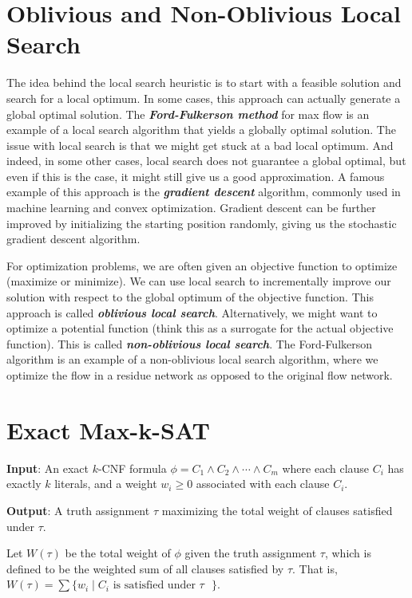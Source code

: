 \section{Oblivious and Non-Oblivious Local Search}    

The idea behind the local search heuristic is to start with a feasible solution and search for a local optimum. In some cases, this approach can actually generate a global optimal solution. The \textit{\textbf{Ford-Fulkerson method}} for max flow is an example of a local search algorithm that yields a globally optimal solution. The issue with local search is that we might get stuck at a bad local optimum. And indeed, in some other cases, local search does not guarantee a global optimal, but even if this is the case, it might still give us a good approximation. A famous example of this approach is the \textit{\textbf{gradient descent}} algorithm, commonly used in machine learning and convex optimization. Gradient descent can be further improved by initializing the starting position randomly, giving us the stochastic gradient descent algorithm.

For optimization problems, we are often given an objective function to optimize (maximize or minimize). We can use local search to incrementally improve our solution with respect to the global optimum of the objective function. This approach is called \textit{\textbf{oblivious local search}}. Alternatively, we might want to optimize a potential function (think this as a surrogate for the actual objective function). This is called \textit{\textbf{non-oblivious local search}}. The Ford-Fulkerson algorithm is an example of a non-oblivious local search algorithm, where we optimize the flow in a residue network as opposed to the original flow network.

\section{Exact Max-k-SAT}

\textbf{Input}: An exact $k$-CNF formula $\phi = C_1 \land C_2 \land \cdots \land C_m$ where each clause $C_i$ has exactly $k$ literals, and a weight $w_i \geq 0$ associated with each clause $C_i$.

\textbf{Output}: A truth assignment $\tau$ maximizing the total weight of clauses satisfied under $\tau$.

Let $W(\tau)$ be the total weight of $\phi$ given the truth assignment $\tau$, which is defined to be the weighted sum of all clauses satisfied by $\tau$. That is, $W(\tau) = \sum \{w_i \mid \text{$C_i$ is satisfied under $\tau$ }\}$. 


